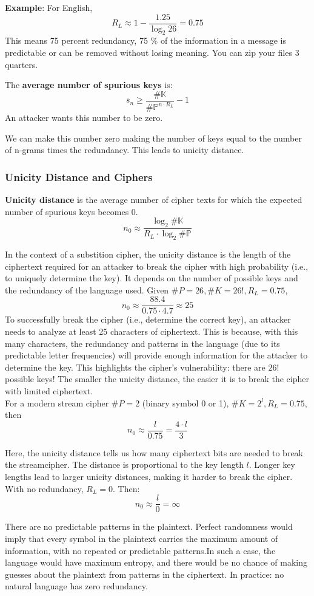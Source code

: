\textbf{Example}: For English,
\[R_L \approx 1-\frac{1.25}{\log_2 26} = 0.75 \]
This means 75 percent redundancy, 75 \% of the information in a message is predictable or can be removed without losing meaning. You can zip your files 3 quarters. 

\begin{defn}
    The \textbf{average number of spurious keys} is:
    \[\bar{s}_n \geq \frac{\#\mathbb{K}}{ \#\mathbb{P}^{n\cdot R_L}}-1 \]
    An attacker wants this number to be zero.
\end{defn}

We can make this number zero making the number of keys equal to the number of n-grams times the redundancy. This leads to unicity distance.

\subsubsection{Unicity Distance and Ciphers}
\begin{defn}
    \textbf{Unicity distance} is the average number of cipher texts for which the expected number of spurious keys becomes 0. 
    \[ n_0 \approx \frac{\log_2 \#\mathbb{K}}{R_L \cdot \log_2 \#\mathbb{P}}\]
\end{defn}

In the context of a substition cipher, the unicity distance is the length of the ciphertext required for an attacker to break the cipher with high probability (i.e., to uniquely determine the key). It depends on the number of possible keys and the redundancy of the language used.
Given $\#P=26, \#K=26!, R_L =0.75$, 
\[n_0 \approx \frac{88.4}{0.75 \cdot 4.7} \approx 25\]
To successfully break the cipher (i.e., determine the correct key), an attacker needs to analyze at least 25 characters of ciphertext. This is because, with this many characters, the redundancy and patterns in the language (due to its predictable letter frequencies) will provide enough information for the attacker to determine the key. This highlights the cipher's vulnerability: there are $26!$ possible keys! The smaller the unicity distance, the easier it is to break the cipher with limited ciphertext. \\

For a modern stream cipher $\#P=2$ (binary symbol 0 or 1), $\#K=2^l, R_L =0.75$, then 
\[ n_0 \approx \frac{l}{0.75} = \frac{4\cdot l}{3}\] 

Here, the unicity distance tells us how many ciphertext bits are needed to break the streamcipher. The distance is proportional to the key length $l$. Longer key lengths lead to larger unicity distances, making it harder to break the cipher. \\

With no redundancy, $R_L = 0$. Then:
\[ n_0 \approx \frac{l}{0} = \infty \]

There are no predictable patterns in the plaintext. Perfect randomness would imply that every symbol in the plaintext carries the maximum amount of information, with no repeated or predictable patterns.In such a case, the language would have maximum entropy, and there would be no chance of making guesses about the plaintext from patterns in the ciphertext. In practice: no natural language has zero redundancy.